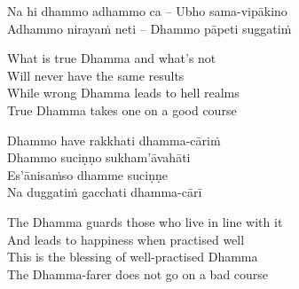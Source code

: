 \suttaRef{[SN 6.2]}

\begin{verses}
  Na hi dhammo adhammo ca – Ubho sama-vipākino\\
  Adhammo nirayaṁ neti – Dhammo pāpeti suggatiṁ
\end{verses}

\begin{english-verses}
  What is true Dhamma and what's\makeatletter\hyperlink{endnote29-appendix}\makeatother
  not\\
  Will never have the same results\\
  While wrong\makeatletter\hyperlink{endnote30-appendix}\makeatother
  Dhamma leads to hell realms\\
  True Dhamma takes one on a good course
\end{english-verses}

\begin{verses}
  Dhammo have rakkhati dhamma-cāriṁ\\
  Dhammo suciṇṇo sukham'āvahāti\\
  Es'ānisaṁso dhamme suciṇṇe\\
  Na duggatiṁ gacchati dhamma-cārī\makeatletter\hyperlink{endnote31-appendix}\makeatother
\end{verses}

\begin{english-verses}
  The Dhamma guards those who live in line with it\\
  And leads to happiness when practised well\\
  This is the blessing of well-practised Dhamma\\
  The Dhamma-farer does not go on a bad course
\end{english-verses}

